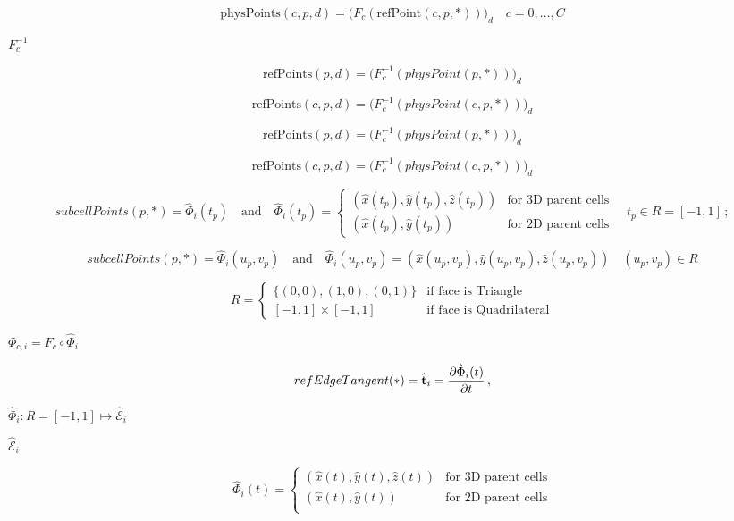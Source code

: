 \documentclass{article}
\begin{document}
\[  
        \mbox{physPoints}(c,p,d) = \Big(F_c(\mbox{refPoint}(c,p,*)) \Big)_d \quad c=0,\ldots, C 
\]
\pagebreak

$ F^{-1}_{c} $
\pagebreak

\[            
        \mbox{refPoints}(p,d) = \Big(F^{-1}_c(physPoint(p,*)) \Big)_d         
\]
\pagebreak

\[            
        \mbox{refPoints}(c,p,d) = \Big(F^{-1}_c(physPoint(c,p,*)) \Big)_d         
\]
\pagebreak

\[            
          \mbox{refPoints}(p,d) = \Big(F^{-1}_c(physPoint(p,*)) \Big)_d         
\]
\pagebreak

\[            
          \mbox{refPoints}(c,p,d) = \Big(F^{-1}_c(physPoint(c,p,*)) \Big)_d         
\]
\pagebreak

\[
        {subcellPoints}(p,*) = \hat{\Phi}_i(t_p) \quad\mbox{and}\quad
        \hat{\Phi}_i(t_p) = \left\{
        \begin{array}{ll}
          (\hat{x}(t_p),\hat{y}(t_p),\hat{z}(t_p)) & \mbox{for 3D parent cells}\\[1.5ex] 
          (\hat{x}(t_p),\hat{y}(t_p))              & \mbox{for 2D parent cells}                 
        \end{array} \right.
        \quad t_p \in R = [-1,1] \,;
 \]
\pagebreak

\[
        {subcellPoints}(p,*) = \hat{\Phi}_i(u_p,v_p)\quad\mbox{and}\quad
        \hat{\Phi}_i(u_p,v_p) = (\hat{x}(u_p,v_p), \hat{y}(u_p,v_p), \hat{z}(u_p, v_p))
        \quad (u_p,v_p)\in R
 \]
\pagebreak

\[
        R = \left\{\begin{array}{rl} 
                  \{(0,0),(1,0),(0,1)\} & \mbox{if face is Triangle} \\[1ex]
                    [-1,1]\times [-1,1] & \mbox{if face is Quadrilateral}
            \end{array}\right.
\]
\pagebreak

$ \Phi_{c,i} =  F_{c}\circ\hat{\Phi}_i $
\pagebreak

\[
        {refEdgeTangent}(*) = \hat{\bf t}_i = {\partial\hat{\Phi}_i(t)\over\partial t}\,,
\]
\pagebreak

$\hat{\Phi}_i : R =[-1,1]\mapsto \hat{\mathcal E}_i$
\pagebreak

$\hat{\mathcal E}_i$
\pagebreak

\[
        \hat{\Phi}_i(t) = \left\{\begin{array}{ll}
            (\hat{x}(t),\hat{y}(t),\hat{z}(t)) & \mbox{for 3D parent cells} \\[1ex]
            (\hat{x}(t),\hat{y}(t))            & \mbox{for 2D parent cells} \\[1ex]
          \end{array}\right.
\]
\pagebreak
\end{document}
